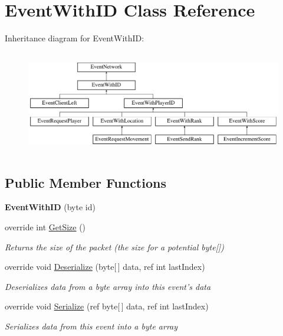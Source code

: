 \hypertarget{class_event_with_i_d}{\section{Event\-With\-I\-D Class Reference}
\label{class_event_with_i_d}
}
Inheritance diagram for Event\-With\-I\-D\-:\begin{figure}[H]
\begin{center}
\leavevmode
\includegraphics[height=4.545455cm]{class_event_with_i_d}
\end{center}
\end{figure}
\subsection*{Public Member Functions}
\begin{DoxyCompactItemize}
\item 
\hypertarget{class_event_with_i_d_a48c52561770e754764bce60a37b18b7c}{{\bfseries Event\-With\-I\-D} (byte id)}\label{class_event_with_i_d_a48c52561770e754764bce60a37b18b7c}

\item 
override int \hyperlink{class_event_with_i_d_af466d916c98ef18a2ca2b3aa4579754e}{Get\-Size} ()
\begin{DoxyCompactList}\small\item\em Returns the size of the packet (the size for a potential byte\mbox{[}\mbox{]}) \end{DoxyCompactList}\item 
override void \hyperlink{class_event_with_i_d_ae82063a78a0cd34dc852e3ae590e35c0}{Deserialize} (byte\mbox{[}$\,$\mbox{]} data, ref int last\-Index)
\begin{DoxyCompactList}\small\item\em Deserializes data from a byte array into this event's data \end{DoxyCompactList}\item 
override void \hyperlink{class_event_with_i_d_acc9b0d1c6a8fc474fb1aeb0f93d47602}{Serialize} (ref byte\mbox{[}$\,$\mbox{]} data, ref int last\-Index)
\begin{DoxyCompactList}\small\item\em Serializes data from this event into a byte array \end{DoxyCompactList}\end{DoxyCompactItemize}
